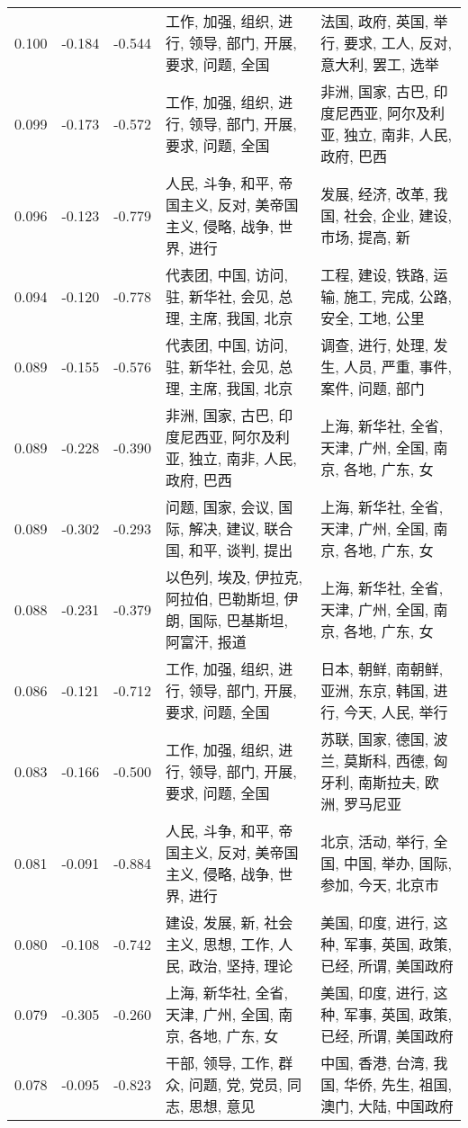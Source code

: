 \begin{tabular}{cccp{5cm}p{5cm}}
0.100 & -0.184 & -0.544 & 工作, 加强, 组织, 进行, 领导, 部门, 开展, 要求, 问题, 全国 & 法国, 政府, 英国, 举行, 要求, 工人, 反对, 意大利, 罢工, 选举 \\
0.099 & -0.173 & -0.572 & 工作, 加强, 组织, 进行, 领导, 部门, 开展, 要求, 问题, 全国 & 非洲, 国家, 古巴, 印度尼西亚, 阿尔及利亚, 独立, 南非, 人民, 政府, 巴西 \\
0.096 & -0.123 & -0.779 & 人民, 斗争, 和平, 帝国主义, 反对, 美帝国主义, 侵略, 战争, 世界, 进行 & 发展, 经济, 改革, 我国, 社会, 企业, 建设, 市场, 提高, 新 \\
0.094 & -0.120 & -0.778 & 代表团, 中国, 访问, 驻, 新华社, 会见, 总理, 主席, 我国, 北京 & 工程, 建设, 铁路, 运输, 施工, 完成, 公路, 安全, 工地, 公里 \\
0.089 & -0.155 & -0.576 & 代表团, 中国, 访问, 驻, 新华社, 会见, 总理, 主席, 我国, 北京 & 调查, 进行, 处理, 发生, 人员, 严重, 事件, 案件, 问题, 部门 \\
0.089 & -0.228 & -0.390 & 非洲, 国家, 古巴, 印度尼西亚, 阿尔及利亚, 独立, 南非, 人民, 政府, 巴西 & 上海, 新华社, 全省, 天津, 广州, 全国, 南京, 各地, 广东, 女 \\
0.089 & -0.302 & -0.293 & 问题, 国家, 会议, 国际, 解决, 建议, 联合国, 和平, 谈判, 提出 & 上海, 新华社, 全省, 天津, 广州, 全国, 南京, 各地, 广东, 女 \\
0.088 & -0.231 & -0.379 & 以色列, 埃及, 伊拉克, 阿拉伯, 巴勒斯坦, 伊朗, 国际, 巴基斯坦, 阿富汗, 报道 & 上海, 新华社, 全省, 天津, 广州, 全国, 南京, 各地, 广东, 女 \\
0.086 & -0.121 & -0.712 & 工作, 加强, 组织, 进行, 领导, 部门, 开展, 要求, 问题, 全国 & 日本, 朝鲜, 南朝鲜, 亚洲, 东京, 韩国, 进行, 今天, 人民, 举行 \\
0.083 & -0.166 & -0.500 & 工作, 加强, 组织, 进行, 领导, 部门, 开展, 要求, 问题, 全国 & 苏联, 国家, 德国, 波兰, 莫斯科, 西德, 匈牙利, 南斯拉夫, 欧洲, 罗马尼亚 \\
0.081 & -0.091 & -0.884 & 人民, 斗争, 和平, 帝国主义, 反对, 美帝国主义, 侵略, 战争, 世界, 进行 & 北京, 活动, 举行, 全国, 中国, 举办, 国际, 参加, 今天, 北京市 \\
0.080 & -0.108 & -0.742 & 建设, 发展, 新, 社会主义, 思想, 工作, 人民, 政治, 坚持, 理论 & 美国, 印度, 进行, 这种, 军事, 英国, 政策, 已经, 所谓, 美国政府 \\
0.079 & -0.305 & -0.260 & 上海, 新华社, 全省, 天津, 广州, 全国, 南京, 各地, 广东, 女 & 美国, 印度, 进行, 这种, 军事, 英国, 政策, 已经, 所谓, 美国政府 \\
0.078 & -0.095 & -0.823 & 干部, 领导, 工作, 群众, 问题, 党, 党员, 同志, 思想, 意见 & 中国, 香港, 台湾, 我国, 华侨, 先生, 祖国, 澳门, 大陆, 中国政府 \\

\end{tabular}
